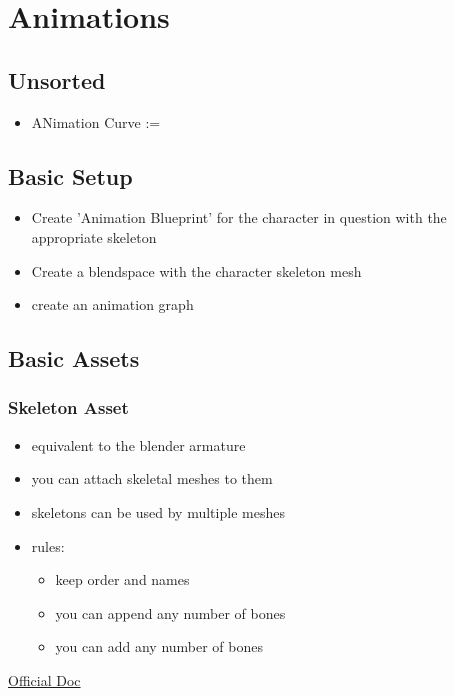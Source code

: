 \chapter{Animations}

    \section{Unsorted}
        \begin{itemize}
            \item ANimation Curve := 
        \end{itemize}


    \section{Basic Setup}
        \begin{itemize}
            \item Create 'Animation Blueprint' for the character in question with the appropriate skeleton
            \item Create a blendspace with the character skeleton mesh
            \item create an animation graph
        \end{itemize}


    \section{Basic Assets}
        \subsection{Skeleton Asset}
            \begin{itemize}
                \item equivalent to the blender armature
                \item you can attach skeletal meshes to them
                \item skeletons can be used by multiple meshes
                \item rules:
                \begin{itemize}
                    \item keep order and names
                    \item you can append any number of bones
                    \item you can add any number of bones
                \end{itemize}
            \end{itemize}
            \href{https://docs.unrealengine.com/4.27/en-US/AnimatingObjects/SkeletalMeshAnimation/Skeleton/}{Official Doc}

